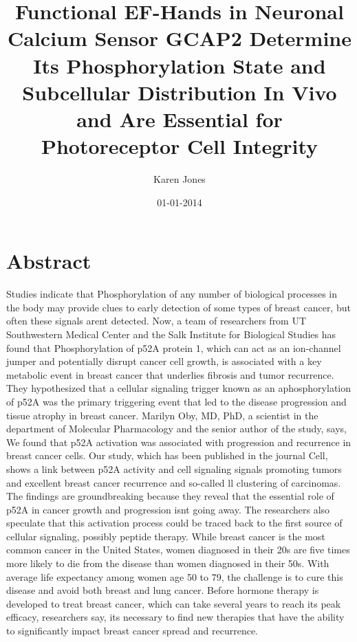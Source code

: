 \documentclass{article}%
\title{Functional EF{-}Hands in Neuronal Calcium Sensor GCAP2 Determine Its Phosphorylation State and Subcellular Distribution In Vivo and Are Essential for Photoreceptor Cell Integrity}%
\author{Karen Jones}%
\affil{Neurophysiology Laboratory, Department of Pharmacology and Experimental Neuroscience, University of Nebraska Medical Center, Omaha, Nebraska, United States of America}%
\date{01{-}01{-}2014}%
\begin{document}
%
\normalsize%
\maketitle%
\section{Abstract}%
\label{sec:Abstract}%
Studies indicate that Phosphorylation of any number of biological processes in the body may provide clues to early detection of some types of breast cancer, but often these signals arent detected.\newline%
Now, a team of researchers from UT Southwestern Medical Center and the Salk Institute for Biological Studies has found that Phosphorylation of p52A protein 1, which can act as an ion{-}channel jumper and potentially disrupt cancer cell growth, is associated with a key metabolic event in breast cancer that underlies fibrosis and tumor recurrence. They hypothesized that a cellular signaling trigger known as an aphosphorylation of p52A was the primary triggering event that led to the disease progression and tissue atrophy in breast cancer.\newline%
Marilyn Oby, MD, PhD, a scientist in the department of Molecular Pharmacology and the senior author of the study, says, We found that p52A activation was associated with progression and recurrence in breast cancer cells. Our study, which has been published in the journal Cell, shows a link between p52A activity and cell signaling signals promoting tumors and excellent breast cancer recurrence and so{-}called ll clustering of carcinomas.\newline%
The findings are groundbreaking because they reveal that the essential role of p52A in cancer growth and progression isnt going away. The researchers also speculate that this activation process could be traced back to the first source of cellular signaling, possibly peptide therapy.\newline%
While breast cancer is the most common cancer in the United States, women diagnosed in their 20s are five times more likely to die from the disease than women diagnosed in their 50s.\newline%
With average life expectancy among women age 50 to 79, the challenge is to cure this disease and avoid both breast and lung cancer. Before hormone therapy is developed to treat breast cancer, which can take several years to reach its peak efficacy, researchers say, its necessary to find new therapies that have the ability to significantly impact breast cancer spread and recurrence.\newline%
\end{document}
